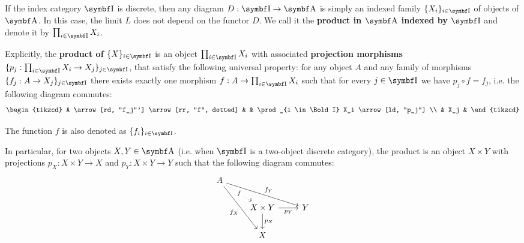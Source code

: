 \begin{definition}\label{def:categorical_product}\cite[definition 5.1.1, 5.1.7]{Leinster2014}
  If the index category \( \Bold I \) is discrete, then any diagram \( D: \Bold I \to \Bold A \) is simply an indexed family \( \{ X_i \}_{i \in \Bold I} \) of objects of \( \Bold A \). In this case, the limit \( L \) does not depend on the functor \( D \). We call it the \textbf{product in \( \Bold A \) indexed by \( \Bold I \)} and denote it by \( \prod_{i \in \Bold I} X_i \).

  Explicitly, the \textbf{product of \( \{ X \}_{i \in \Bold I} \)} is an object \( \prod_{i \in \Bold I} X_i \) with associated \textbf{projection morphisms} \( \{ p_j: \prod_{i \in \Bold I} X_i \to X_j \}_{j \in \Bold I} \), that satisfy the following universal property: for any object \( A \) and any family of morphisms \( \{ f_j: A \to {X_j} \}_{j \in \Bold I} \) there exists exactly one morphism \( f: A \to \prod_{i \in \Bold I} X_i \) such that for every \( j \in \Bold I \) we have \( p_j \circ f = f_j \), i.e. the following diagram commutes:
  \begin{equation*}
    \begin{tikzcd}
      A \arrow[rd, "f_j"'] \arrow[rr, "f", dotted] & & \prod_{i \in \Bold I} X_i \arrow[ld, "p_j"] \\
      & X_j &
    \end{tikzcd}
  \end{equation*}

  The function \( f \) is also denoted as \( \{ f_i \}_{i \in \Bold I} \).

  In particular, for two objects \( X, Y \in \Bold A \) (i.e. when \( \Bold I \) is a two-object discrete category), the product is an object \( X \times Y \) with projections \( p_X: X \times Y \to X \) and \( p_Y: X \times Y \to Y \) such that the following diagram commutes:
  \begin{equation*}
    \begin{tikzcd}
      A \arrow[rd, "f" description, dotted] \arrow[rrd, "f_Y"] \arrow[rdd, "f_X"'] &                                               &   \\
                                                                                   & X \times Y \arrow[r, "p_Y"'] \arrow[d, "p_X"] & Y \\
                                                                                   & X                                             &
    \end{tikzcd}
  \end{equation*}
\end{definition}

